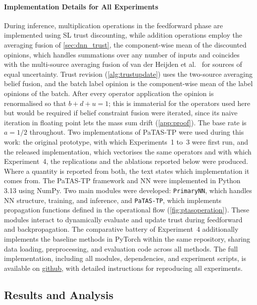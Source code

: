 \paragraph*{Implementation Details for All Experiments}
During inference, multiplication operations in the feedforward phase are implemented using \ac{SL} trust discounting, while addition operations employ the averaging fusion of \cref{sec:dnn_trust}, the component-wise mean of the discounted opinions, which handles summations over any number of inputs and coincides with the multi-source averaging fusion of van der Heijden et al.~\cite{vanderheijden2018multisourcefusionoperationssubjective} for sources of equal uncertainty. Trust revision (\cref{alg:trustupdate}) uses the two-source averaging belief fusion, and the batch label opinion is the component-wise mean of the label opinions of the batch. After every operator application the opinion is renormalised so that $b + d + u = 1$; this is immaterial for the operators used here but would be required if belief constraint fusion were iterated, since its naive iteration in floating point lets the mass sum drift (\cref{app:proof}). The base rate is $a = 1/2$ throughout. Two implementations of \ac{PaTAS-TP} were used during this work: the original prototype, with which Experiments~1 to~3 were first run, and the released implementation, which vectorises the same operators and with which Experiment~4, the replications and the ablations reported below were produced. Where a quantity is reported from both, the text states which implementation it comes from. The \ac{PaTAS-TP} framework and \ac{NN} were implemented in Python 3.13 using NumPy. Two main modules were developed: \texttt{PrimaryNN}, which handles \ac{NN} structure, training, and inference, and \texttt{PaTAS-TP}, which implements  propagation functions defined in the operational flow (\cref{fig:ptasoperation}). These modules interact to dynamically evaluate and update trust during feedforward and backpropagation. The comparative battery of Experiment~4 additionally implements the baseline methods in PyTorch within the same repository, sharing data loading, preprocessing, and evaluation code across all methods. The full implementation, including all modules, dependencies, and experiment scripts, is available on \href{https://github.com/Ouatt-Isma/PaTAS-Subjective-Logic-Neural-Networks-Trust-Assessment}{github}, with detailed instructions for reproducing all experiments.

\subsection{Results and Analysis}

